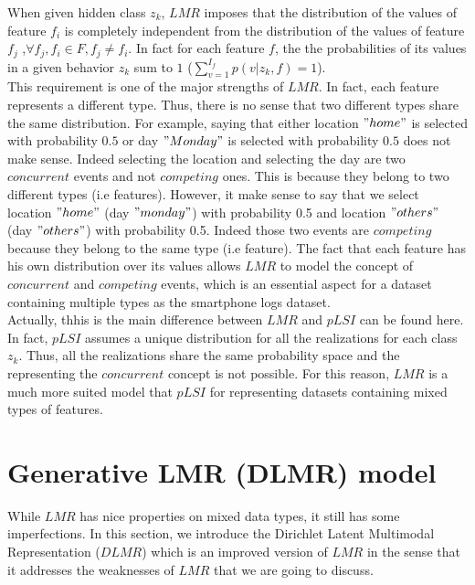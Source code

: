 When given hidden class $z_{k}$, $LMR$ imposes that the distribution of the values of feature $f_{i}$ is completely independent from the distribution of the values of feature $f_{j}$ ,$\forall f_{j}, f_{i}\in F , f_{j}\neq f_{i}$. In fact for each feature $f$, the the probabilities of its values in a given behavior $z_{k}$ sum to $1$ ($\sum_{v=1}^{I_{f}}p(v|z_{k},f)=1$).
\\This requirement is one of the major strengths of $LMR$. In fact, each feature represents a different type. Thus, there is no sense that two different types share the same distribution. For example, saying that either location $"home"$ is selected with probability $0.5$ or day $"Monday"$ is selected with probability $0.5$ does not make sense. Indeed selecting the location and selecting the day are two $concurrent$ events and not $competing$ ones. This is because they belong to two different types (i.e features). However, it make sense to say that we select location $"home"$ (day $"monday"$) with probability 0.5 and location $"others"$ (day $"others"$) with probability 0.5. Indeed those two events are $competing$ because they belong to the same type (i.e feature). The fact that each feature has his own distribution over its values allows $LMR$ to model the concept of $concurrent$ and $competing$ events, which is an essential aspect for a dataset containing multiple types as the smartphone logs dataset.
\\Actually, thhis is the main difference between $LMR$ and $pLSI$ can be found here. In fact, $pLSI$ assumes a unique distribution for all the realizations for each class $z_{k}$. Thus, all the realizations share the same probability space and the representing the $concurrent$ concept is not possible. For this reason, $LMR$ is a much more suited model that $pLSI$ for representing datasets containing mixed types of features.






\section{Generative LMR (DLMR) model}
While $LMR$ has nice properties on mixed data types, it still has some imperfections. In this section, we introduce the Dirichlet Latent Multimodal Representation ($DLMR$) which is an improved version of $LMR$ in the sense that it addresses the weaknesses of $LMR$ that we are going to discuss.

